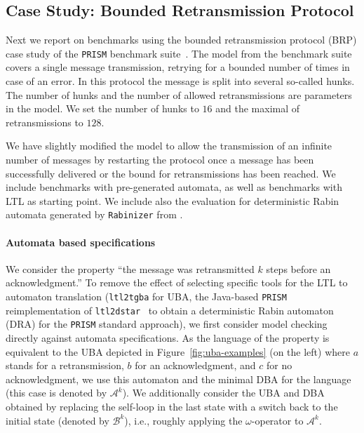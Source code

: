 \documentclass{elsarticle}
\def\cA{\mathcal{A}}
\def\cB{\mathcal{B}}
\newcommand{\prism}{\texttt{PRISM}}
\newcommand{\ltltodstar}{\texttt{ltl2dstar}}
\newcommand{\ltltotgba}{\texttt{ltl2tgba}}
\newcommand{\rabinizer}{\texttt{Rabinizer}}
\begin{document}
\subsection{Case Study: Bounded Retransmission Protocol}

Next we report on benchmarks using the bounded retransmission protocol (BRP)
case study of the \prism{} benchmark suite~\cite{prismBenchmark}.  The model
from the benchmark suite covers a single message transmission, retrying for a
bounded number of times in case of an error. In this protocol the message is
split into several so-called hunks. The number of hunks and the number of
allowed retransmissions are parameters in the model. We set the number of hunks
to $16$ and the maximal of retransmissions to $128$.

We have slightly modified the model
to allow the transmission of an infinite number of messages by restarting the
protocol once a message has been successfully delivered or the bound for
retransmissions has been reached.  We include benchmarks with pre-generated
automata, as well as benchmarks with LTL as starting point.
We include also the
evaluation for deterministic Rabin automata generated by \rabinizer{} from \cite{KMSZ18}.



\paragraph{Automata based specifications}
We consider the property ``the message was retransmitted \(k\) steps before an
acknowledgment.''
To remove the effect of selecting specific tools for the LTL to automaton
translation (\ltltotgba{} for UBA, the Java-based \prism{}
reimplementation of \ltltodstar{}~\cite{KB06} to obtain a
deterministic Rabin automaton (DRA) for the \prism{} standard approach),
we first consider model checking directly against automata specifications.
As the language of the property is equivalent to the UBA depicted in
Figure~\ref{fig:uba-examples} (on the left) where
\(a\) stands for a retransmission, \(b\) for an acknowledgment, and \(c\) for
no acknowledgment, we use this automaton and the minimal DBA for
the language (this case is denoted by $\cA^k$). We additionally consider
the UBA and DBA obtained by replacing the self-loop in the last state with a
switch back to the initial state (denoted by $\cB^k$), i.e., roughly applying
the $\omega$-operator to $\cA^k$.
\end{document}
